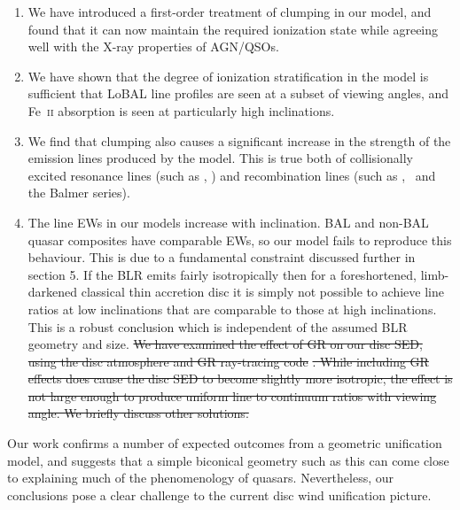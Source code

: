 \documentclass[useAMS,usenatbib]{mn2e_x}
\providecommand{\DIFdel}[1]{{\protect\color{red}\sout{#1}}}                      %
\providecommand{\DIFdelbegin}{} %
\providecommand{\DIFdelend}{} %
\begin{document}
\begin{enumerate}
\item We have introduced a first-order treatment 
of clumping in our model, and found that it can now maintain
the required ionization state while agreeing well with the X-ray
properties of AGN/QSOs.
\smallskip
\item We have shown that the degree of ionization stratification
in the model is sufficient that LoBAL line profiles
are seen at a subset of viewing angles, and Fe~\textsc{ii}
absorption is seen at particularly high inclinations.
\smallskip
\item We find that clumping also causes a significant 
increase in the strength of the  emission
lines produced by the model. This is true both
of collisionally excited resonance lines (such as \civ, \nv)
and recombination lines (such as \la, \ha\ and the Balmer series).
\smallskip
\item The line EWs in our models increase with inclination.
BAL and non-BAL quasar composites have comparable EWs, so our model
fails to reproduce this behaviour.
This is due to a fundamental constraint discussed further in section 5. If the BLR
emits fairly isotropically then for a foreshortened, limb-darkened classical thin accretion disc
it is simply not possible to achieve line ratios at low inclinations that are comparable to
those at high inclinations. This is a robust conclusion which 
is independent of the assumed BLR geometry and size.
\DIFdelbegin %
\DIFdel{We have examined the effect of GR on our disc SED, using the disc atmosphere
and GR ray-tracing code }%
\DIFdel{. While including GR effects
does cause the disc SED to become slightly more isotropic,
the effect is not large enough to produce uniform line to continuum ratios
with viewing angle. We briefly discuss other solutions.
}\DIFdelend %
\end{enumerate}
Our work confirms a number of expected outcomes from a geometric unification 
model, and suggests that a simple biconical geometry such as this can come close to 
explaining much of the  phenomenology of quasars. Nevertheless, our conclusions pose 
a clear challenge to the current disc wind unification picture.
\end{document}
